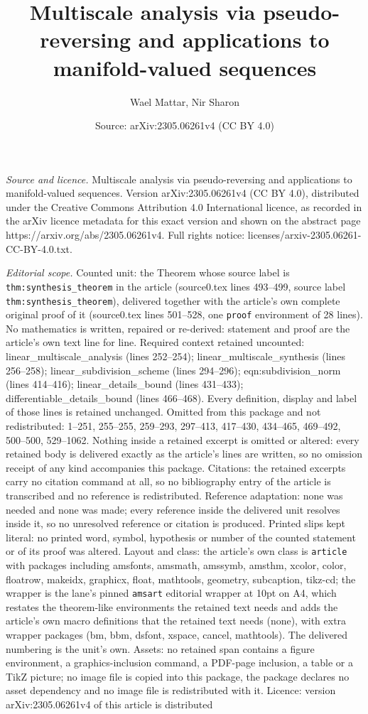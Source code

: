 \documentclass[10pt,a4paper]{amsart}
\title[Multiscale analysis via pseudo-reversing and applications to]{Multiscale analysis via pseudo-reversing and applications to manifold-valued sequences}
\author{Wael Mattar, Nir Sharon}
\date{Source: arXiv:2305.06261v4 (CC BY 4.0)}
\begin{document}
\maketitle

\noindent\emph{Source and licence.} Multiscale analysis via pseudo-reversing and applications to manifold-valued sequences. Version arXiv:2305.06261v4 (CC BY 4.0), distributed under the Creative Commons Attribution 4.0 International licence, as recorded in the arXiv licence metadata for this exact version and shown on the abstract page https://arxiv.org/abs/2305.06261v4. Full rights notice: licenses/arxiv-2305.06261-CC-BY-4.0.txt.\par\smallskip

\noindent\textit{Editorial scope.} Counted unit: the Theorem whose source label is \texttt{thm:synthesis\_theorem} in the article (source0.tex lines 493--499, source label \texttt{thm:synthesis\_theorem}), delivered together with the article's own complete original proof of it (source0.tex lines 501--528, one \texttt{proof} environment of 28 lines). No mathematics is written, repaired or re-derived: statement and proof are the article's own text line for line. Required context retained uncounted: linear\_multiscale\_analysis (lines 252--254); linear\_multiscale\_synthesis (lines 256--258); linear\_subdivision\_scheme (lines 294--296); eqn:subdivision\_norm (lines 414--416); linear\_details\_bound (lines 431--433); differentiable\_details\_bound (lines 466--468). Every definition, display and label of those lines is retained unchanged. Omitted from this package and not redistributed: 1--251, 255--255, 259--293, 297--413, 417--430, 434--465, 469--492, 500--500, 529--1062. Nothing inside a retained excerpt is omitted or altered: every retained body is delivered exactly as the article's lines are written, so no omission receipt of any kind accompanies this package. Citations: the retained excerpts carry no citation command at all, so no bibliography entry of the article is transcribed and no reference is redistributed. Reference adaptation: none was needed and none was made; every reference inside the delivered unit resolves inside it, so no unresolved reference or citation is produced. Printed slips kept literal: no printed word, symbol, hypothesis or number of the counted statement or of its proof was altered. Layout and class: the article's own class is \texttt{article} with packages including amsfonts, amsmath, amssymb, amsthm, xcolor, color, floatrow, makeidx, graphicx, float, mathtools, geometry, subcaption, tikz-cd; the wrapper is the lane's pinned \texttt{amsart} editorial wrapper at 10pt on A4, which restates the theorem-like environments the retained text needs and adds the article's own macro definitions that the retained text needs (none), with extra wrapper packages (bm, bbm, dsfont, xspace, cancel, mathtools). The delivered numbering is the unit's own. Assets: no retained span contains a figure environment, a graphics-inclusion command, a PDF-page inclusion, a table or a TikZ picture; no image file is copied into this package, the package declares no asset dependency and no image file is redistributed with it. Licence: version arXiv:2305.06261v4 of this article is distributed 
\end{document}
